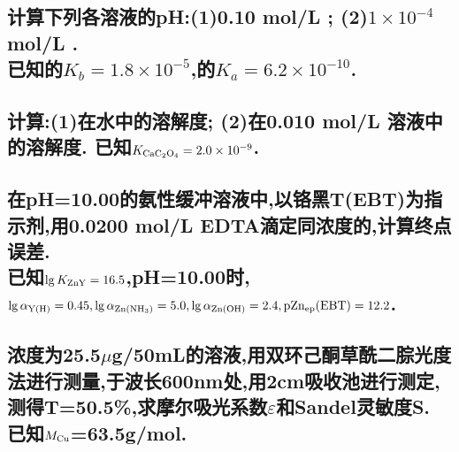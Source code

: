 \documentclass[UTF8]{article}
\newcommand{\p}{\mathrm{p}}
\newcommand{\ind}{\hspace{-1pt}}
\begin{document}
    \subsection{计算下列各溶液的pH:(1)0.10 mol/L ; (2)$1\times 10^{-4}$ mol/L .\\ 已知的$K_b=1.8\times 10^{-5}$,的$K_{a}=6.2\times 10^{-10}$.}
    
    \subsection{计算:(1)在水中的溶解度; (2)在0.010 mol/L 溶液中的溶解度. 已知$K_{\ce{CaC2O4}}=2.0\times 10^{-9}$.}
    
    \subsection{在\ind pH=10.00\ind 的氨性缓冲溶液中,以铬黑\ind T(EBT)\ind 为指示剂,用\ind 0.0200 mol/L EDTA\ind 滴定同浓度的,\ind 计算终点误差.\\ 已知$\lg K_{\ce{ZnY}}=16.5$,pH=10.00时,$\lg \alpha_{\ce{Y(H)}}=0.45, \lg \alpha_{\ce{Zn(NH3)}}=5.0, \lg \alpha_{\ce{Zn(OH)}}=2.4, \p\ce{Zn_{ep}(EBT)}=12.2$.}
    
    \subsection{浓度为25.5$\mu$g/50mL的溶液,用双环己酮草酰二腙光度法进行测量,于波长600nm处,用2cm吸收池进行测定,测得T=50.5\%,求摩尔吸光系数$\varepsilon$和Sandel灵敏度S. 已知$M_{\ce{Cu}}$=63.5g/mol.}
    
\end{document}
